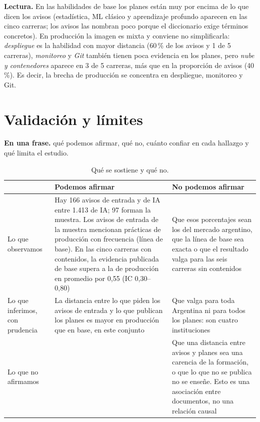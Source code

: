 \documentclass[11pt,a4paper]{article}
\begin{document}
\textbf{Lectura.} En las habilidades de base los planes están muy por encima de lo que dicen los avisos (estadística, ML clásico y aprendizaje profundo aparecen en las cinco carreras; los avisos las nombran poco porque el diccionario exige términos concretos). En producción la imagen es mixta y conviene no simplificarla: \emph{despliegue} es la habilidad con mayor distancia (60\,\% de los avisos y 1 de 5 carreras), \emph{monitoreo} y \emph{Git} también tienen poca evidencia en los planes, pero \emph{nube y contenedores} aparece en 3 de 5 carreras, más que en la proporción de avisos (40\,\%). Es decir, la brecha de producción se concentra en despliegue, monitoreo y Git.

\section{Validación y límites}
\begin{enunasola}\textbf{En una frase.} qué podemos afirmar, qué no, cuánto confiar en cada hallazgo y qué limita el estudio.\end{enunasola}


\begin{table}[H]
\centering\small
\begin{tabularx}{\textwidth}{L{3cm} X X}
\toprule
{} & \textbf{Podemos afirmar} & \textbf{No podemos afirmar}\\
\midrule
Lo que observamos & Hay 166 avisos de entrada y de IA entre 1.413 de IA; 97 forman la muestra. Los avisos de entrada de la muestra mencionan prácticas de producción con frecuencia (línea de base). En las cinco carreras con contenidos, la evidencia publicada de base supera a la de producción en promedio por 0,55 (IC 0,30--0,80) & Que esos porcentajes sean los del mercado argentino, que la línea de base sea exacta o que el resultado valga para las seis carreras sin contenidos\\
Lo que inferimos, con prudencia & La distancia entre lo que piden los avisos de entrada y lo que publican los planes es mayor en producción que en base, en este conjunto & Que valga para toda Argentina ni para todos los planes: son cuatro instituciones\\
Lo que no afirmamos & & Que una distancia entre avisos y planes sea una carencia de la formación, o que lo que no se publica no se enseñe. Esto es una asociación entre documentos, no una relación causal\\
\bottomrule
\end{tabularx}
\caption{Qué se sostiene y qué no.}
\end{table}
\end{document}
